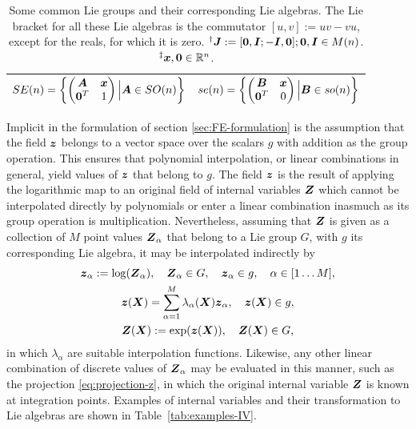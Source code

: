 \documentclass[12pt]{article}
\newcommand{\mbs}[1]{\boldsymbol{#1}}
\newcommand{\mbb}[1]{\mathbb{#1}}
\def\bA{{\mbs{A}}} \def\bB{{\mbs{B}}} \def\bC{{\mbs{C}}}
\def\bJ{{\mbs{J}}} \def\bK{{\mbs{K}}} \def\bL{{\mbs{L}}}
\begin{document}
\begin{table}[htbp]
\begin{center}
\begin{tabular}{ l l }
      \\
      $SE(n)=\left\{
      \begin{pmatrix}
        \bA & \bx
        \\
        \mathbf{0}^T & 1
      \end{pmatrix}
      \Big | \bA \in SO(n) \right\}$
      &
      $se(n)=\left\{
      \begin{pmatrix}
        \bB & \bx
        \\
        \mathbf{0}^T & 0
      \end{pmatrix}
      \Big | \bB \in so(n) \right\}$
      \\
      \bottomrule
    \end{tabular}
    \caption{Some common Lie groups and their corresponding Lie
      algebras. The Lie bracket for all these Lie algebras is the
      commutator $[u,v] := uv - vu$, except for the reals, for which
      it is zero. $^\dagger \bJ := [\mathbf{0}, \bI; -\bI, \mathbf{0}];
      \mathbf{0}, \bI \in M(n)$. $^\ddagger \bx, \mathbf{0} \in \mbb{R}^n$.}
    \label{tab:Lie-groups-and-algebras}
  \end{center}
\end{table}

Implicit in the formulation of section \ref{sec:FE-formulation} is the
assumption that the field $\bz$ belongs to a vector space over the scalars $g$
with addition as the group operation.  This ensures that polynomial
interpolation, or linear combinations in general, yield values of $\bz$ that
belong to $g$. The field $\bz$ is the result of applying the logarithmic map to
an original field of internal variables $\bZ$ which cannot be interpolated
directly by polynomials or enter a linear combination inasmuch as its group
operation is multiplication.  Nevertheless, assuming that $\bZ$ is given as a
collection of $M$ point values $\bZ_\alpha$ that belong to a Lie group $G$, with
$g$ its corresponding Lie algebra, it may be interpolated indirectly by
\begin{gather} \label{eq:interpolation-begin}
  \bz_\alpha := \log(\bZ_\alpha),
  \quad \bZ_\alpha \in G,
  \quad \bz_\alpha \in g,
  \quad \alpha \in [1 \ldots M],
  \\
  \bz(\bX) = \sum_{\alpha=1}^M \lambda_\alpha(\bX) \bz_\alpha,
  \quad \bz(\bX) \in g,
  \\
  \bZ(\bX) := \exp(\bz(\bX)),
  \quad \bZ(\bX) \in G, \label{eq:interpolation-end}
\end{gather}
in which $\lambda_\alpha$ are suitable interpolation
functions.  Likewise, any other linear combination of discrete values
of $\bZ_\alpha$ may be evaluated in this manner, such as the
projection \eqref{eq:projection-z}, in which the original internal
variable $\bZ$ is known at integration points. Examples of internal
variables and their transformation to Lie algebras are shown in
Table~\ref{tab:examples-IV}.
\end{document}
